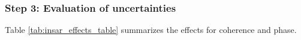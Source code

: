 



\subsubsection{Step 3: Evaluation of uncertainties}
Table \ref{tab:insar_effects_table} summarizes the effects for coherence and phase.



